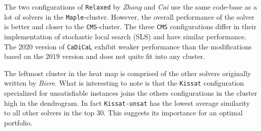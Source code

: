 \documentclass{elsarticle}
\newcommand{\solver}[1]{\texttt{#1}}
\begin{document}
The two configurations of \solver{Relaxed} by \emph{Zhang} and \emph{Cai}
use the same code-base as a lot of solvers in the \solver{Maple}-cluster. However, the
overall performance of the solver is better and closer to the \solver{CMS}-cluster.
The three \solver{CMS} configurations
differ in their implementation of stochastic local search
(SLS) and have similar performance.
The 2020 version of \solver{CaDiCaL}
exhibit weaker performance than the modifications based on the 2019 version and
does not quite fit into any cluster.

The leftmost cluster in the heat map is comprised of the other solvers
originally written by \emph{Biere}. What is interesting to note is that the
\solver{Kissat} configuration specialized for unsatisfiable instances joins the
others configurations in the cluster high in the dendrogram. In fact \solver{Kissat-unsat} has
the lowest average similarity to all other solvers in the top 30.
This suggests its importance for an optimal
portfolio.

\end{document}
